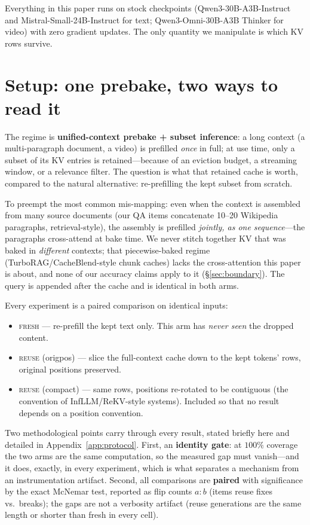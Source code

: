 \documentclass{article} %
\newcommand{\fresh}{\textsc{fresh}}
\newcommand{\reuse}{\textsc{reuse}}
\begin{document}
Everything in this paper runs on stock checkpoints (Qwen3-30B-A3B-Instruct and Mistral-Small-24B-Instruct for text; Qwen3-Omni-30B-A3B Thinker for video) with zero gradient updates. The only quantity we manipulate is which KV rows survive.

\section{Setup: one prebake, two ways to read it}
\label{sec:setup}

The regime is \textbf{unified-context prebake + subset inference}: a long context (a multi-paragraph document, a video) is prefilled \emph{once} in full; at use time, only a subset of its KV entries is retained---because of an eviction budget, a streaming window, or a relevance filter. The question is what that retained cache is worth, compared to the natural alternative: re-prefilling the kept subset from scratch.

To preempt the most common mis-mapping: even when the context is assembled from many source documents (our QA items concatenate 10--20 Wikipedia paragraphs, retrieval-style), the assembly is prefilled \emph{jointly, as one sequence}---the paragraphs cross-attend at bake time. We never stitch together KV that was baked in \emph{different} contexts; that piecewise-baked regime (TurboRAG\slash CacheBlend-style chunk caches) lacks the cross-attention this paper is about, and none of our accuracy claims apply to it (\S\ref{sec:boundary}). The query is appended after the cache and is identical in both arms.

Every experiment is a paired comparison on identical inputs:

\begin{itemize}[leftmargin=2em]
\item \fresh{} --- re-prefill the kept text only. This arm has \emph{never seen} the dropped content.
\item \reuse{} (origpos) --- slice the full-context cache down to the kept tokens' rows, original positions preserved.
\item \reuse{} (compact) --- same rows, positions re-rotated to be contiguous (the convention of InfLLM/ReKV-style systems). Included so that no result depends on a position convention.
\end{itemize}

Two methodological points carry through every result, stated briefly here and detailed in Appendix~\ref{app:protocol}. First, an \textbf{identity gate}: at $100\%$ coverage the two arms are the same computation, so the measured gap must vanish---and it does, exactly, in every experiment, which is what separates a mechanism from an instrumentation artifact. Second, all comparisons are \textbf{paired} with significance by the exact McNemar test, reported as flip counts $a{:}b$ (items reuse fixes vs.\ breaks); the gaps are not a verbosity artifact (reuse generations are the same length or shorter than fresh in every cell).
\end{document}
